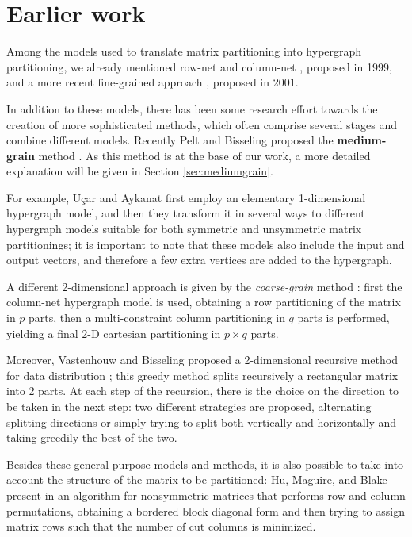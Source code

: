 \section{Earlier work} \label{sec:earlier_work} 

Among the models used to translate matrix partitioning into hypergraph partitioning, we already mentioned row-net and column-net \cite{hypergraph_model}, proposed in 1999, and a more recent fine-grained approach \cite{hypergraph_finegrain}, proposed in 2001. 

In addition to these models, there has been some research effort towards the creation of more sophisticated methods, which often comprise several stages and combine different models. Recently Pelt and Bisseling proposed the \textbf{medium-grain} method \cite{mediumgrain}.  As this method is at the base of our work, a more detailed explanation will be given in Section \ref{sec:mediumgrain}.

For example, Uçar and Aykanat \cite{hypergraph_revisiting} first employ an elementary 1-dimensional hypergraph model, and then they transform it in several ways to different hypergraph models suitable for both symmetric and unsymmetric matrix partitionings; it is important to note that these models also include the input and output vectors, and therefore a few extra vertices are added to the hypergraph.

A different 2-dimensional approach is given by the \emph{coarse-grain} method \cite{hypergraph_coarsegrain}: first the column-net hypergraph model is used, obtaining a row partitioning of the matrix in $p$ parts, then a multi-constraint column partitioning in $q$ parts is performed, yielding a final 2-D cartesian partitioning in $p \times q$ parts. 

Moreover, Vastenhouw and Bisseling proposed a 2-dimensional recursive method for data distribution \cite{mondriaan}; this greedy method splits recursively a rectangular matrix into 2 parts.
At each step of the recursion, there is the choice on the direction to be taken in the next step: two different strategies are proposed, alternating splitting directions or simply trying to split both vertically and horizontally and taking greedily the best of the two.

Besides these general purpose models and methods, it is also possible to take into account the structure of the matrix to be partitioned: Hu, Maguire, and Blake present in \cite{hu2000} an algorithm for nonsymmetric matrices that performs row and column permutations, obtaining a bordered block diagonal form and then trying to assign matrix rows such that the number of cut columns is minimized.

